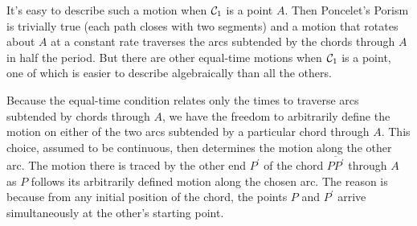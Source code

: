 \documentclass{ximera}
\begin{document}

It's easy to describe such a motion when ${\cal C}_1$ is a point $A$. Then Poncelet's Porism is trivially true (each path closes with two segments) and a motion that rotates about $A$ at a constant rate traverses the arcs subtended by the chords through $A$ in half the period. But there are other equal-time motions when ${\cal C}_1$ is a point, one of which is easier to describe algebraically than all the others. 

Because the equal-time condition relates only the times to traverse arcs subtended by chords through $A$, we have the freedom to arbitrarily define the motion on either of the two arcs subtended by a particular chord through $A$. This choice, assumed to be continuous, then determines the motion along the other arc. The motion there is traced by the other end $P^\prime$ of the chord $\overline{PP^\prime}$ through $A$ as $P$ follows its arbitrarily defined motion along the chosen arc. The reason is because from any initial position of the chord, the points $P$ and $P^\prime$ arrive simultaneously at the other's starting point.



\end{document}
